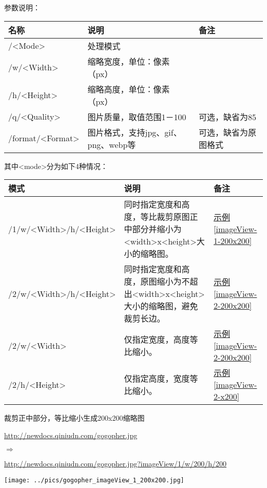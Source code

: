 \documentclass[11pt, oneside]{book}
\newcommand{\qsym}[1]{
\footnotesize
\noindent
#1\par
\normalsize
}
\newcommand{\qpara}[1]{
\vspace{0.3em}
\noindent
#1\par
\vspace{0.3em}
}
\newcommand{\qsamplelink}[1]{
\vspace{0.2em}
\noindent
#1\par
\vspace{0.1em}
}
\newcommand{\qurl}[1]{\footnotesize\url{#1}\normalsize}
\newcommand{\qtable}[1]{\footnotesize\vspace{0.5em}#1\vspace{0.5em}\normalsize}
\newcommand{\qsample}[1]{\hyperref[#1]{示例\ref*{#1}}}
\begin{document}
\qpara{参数说明：}
\qtable{
\def\arraystretch{2}
\begin{tabular}{|l|l|l|}
\hline
名称 & 说明 & 备注\\
\hline
/\textless Mode\textgreater & 处理模式 & \\
\hline
/w/\textless Width\textgreater & 缩略宽度，单位：像素（px） & \\
\hline
/h/\textless Height\textgreater & 缩略高度，单位：像素（px） & \\
\hline
/q/\textless Quality\textgreater & 图片质量，取值范围1－100 & 可选，缺省为85 \\
\hline
/format/\textless Format\textgreater & 图片格式，支持jpg、gif、png、webp等 & 可选，缺省为原图格式 \\
\hline
\end{tabular}
}

\qpara{其中\textless mode\textgreater 分为如下4种情况：}
\qtable{
\def\arraystretch{2}
\begin{tabular}{|l|p{20em}|p{5em}|}
\hline
模式 & 说明 & 备注 \\
\hline
/1/w/\textless Width\textgreater /h/\textless Height\textgreater & 同时指定宽度和高度，等比裁剪原图正中部分并缩小为\textless width\textgreater x\textless height\textgreater 大小的缩略图。& \qsample{imageView-1-200x200} \\
\hline
/2/w/\textless Width\textgreater /h/\textless Height\textgreater & 同时指定宽度和高度，原图缩小为不超出\textless width\textgreater x\textless height\textgreater 大小的缩略图，避免裁剪长边。& \qsample{imageView-2-200x200} \\
\hline
/2/w/\textless Width\textgreater & 仅指定宽度，高度等比缩小。 & \qsample{imageView-2-200x200} \\
\hline
/2/h/\textless Height\textgreater & 仅指定高度，宽度等比缩小。 & \qsample{imageView-2-x200} \\
\hline
\end{tabular}
}

\clearpage

\begin{sample}
  \caption{裁剪正中部分，等比缩小生成200x200缩略图}
    \qsamplelink{\qurl{http://newdocs.qiniudn.com/gogopher.jpg}}
    \qsym{$\Rightarrow$}
    \qsamplelink{\qurl{http://newdocs.qiniudn.com/gogopher.jpg?imageView/1/w/200/h/200}}

    \begin{center}
      \texttt{[image: ../pics/gogopher\_imageView\_1\_200x200.jpg]}
    \end{center}
  \label{imageView-1-200x200}
\end{sample}
\end{document}
